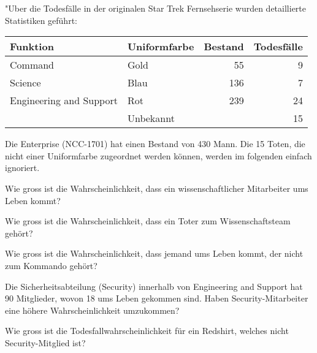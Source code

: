 "Uber die Todesfälle in der originalen Star Trek Fernsehserie wurden
detaillierte Statistiken geführt:
\begin{center}
\begin{tabular}{|l|l|r|r|}
\hline
Funktion&Uniformfarbe&Bestand&Todesfälle\\
\hline
Command&Gold&55&9\\
Science&Blau&136&7\\
Engineering and Support&Rot&239&24\\
&Unbekannt&&15\\
\hline
\end{tabular}
\end{center}
Die Enterprise (NCC-1701) hat einen Bestand von 430 Mann.
Die 15 Toten, die nicht einer Uniformfarbe zugeordnet werden können, werden
im folgenden einfach ignoriert.
\begin{teilaufgaben}
\item
Wie gross ist die Wahrscheinlichkeit, dass ein wissenschaftlicher Mitarbeiter
ums Leben kommt?
\item
Wie gross ist die Wahrscheinlichkeit, dass ein Toter zum Wissenschaftsteam
gehört?
\item
Wie gross ist die Wahrscheinlichkeit, dass jemand ums Leben kommt, der
nicht zum Kommando gehört?
\item 
Die Sicherheitsabteilung (Security) innerhalb von Engineering and Support
hat 90 Mitglieder, wovon 18 ums Leben gekommen sind.
Haben Security-Mitarbeiter eine höhere Wahrscheinlichkeit umzukommen?
\item
Wie gross ist die Todesfallwahrscheinlichkeit für ein Redshirt, welches
nicht Security-Mitglied ist?
\end{teilaufgaben}

